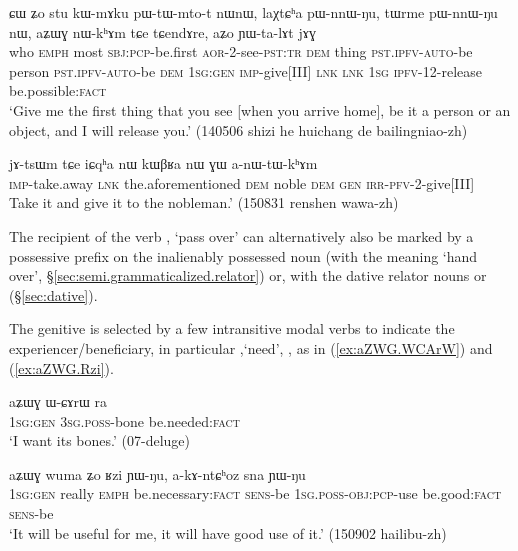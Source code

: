 \begin{exe}
\ex \label{ex:aZWG.nWkhAm}
 \gll ɕɯ ʑo stu kɯ-mɤku pɯ-tɯ-mto-t nɯnɯ, laχtɕʰa pɯ-nnɯ-ŋu, tɯrme pɯ-nnɯ-ŋu nɯ, aʑɯɣ nɯ-kʰɤm tɕe tɕendɤre, aʑo ɲɯ-ta-lɤt jɤɣ \\
 who \textsc{emph} most \textsc{sbj}:\textsc{pcp}-be.first \textsc{aor}-2-see-\textsc{pst}:\textsc{tr} \textsc{dem}  thing \textsc{pst}.\textsc{ipfv}-\textsc{auto}-be   person \textsc{pst}.\textsc{ipfv}-\textsc{auto}-be \textsc{dem} \textsc{1sg}:\textsc{gen} \textsc{imp}-give[III] \textsc{lnk} \textsc{lnk} \textsc{1sg} \textsc{ipfv}-1\fl{}2-release be.possible:\textsc{fact} \\
 \glt `Give me the first thing that you see [when you arrive home], be it a person or an object, and I will release you.' (140506 shizi he huichang de bailingniao-zh)
\end{exe}

\begin{exe}
\ex \label{ex:GW.anWtWkhAm}
 \gll jɤ-tsɯm tɕe iɕqʰa nɯ kɯβʁa nɯ ɣɯ a-nɯ-tɯ-kʰɤm \\
 \textsc{imp}-take.away \textsc{lnk} the.aforementioned \textsc{dem} noble \textsc{dem} \textsc{gen} \textsc{irr}-\textsc{pfv}-2-give[III] \\
 \glt  Take it and give it to the nobleman.' (150831 renshen wawa-zh) 
\end{exe}
 
The recipient of the verb  , `pass over' can alternatively also be marked by a possessive prefix on the inalienably possessed noun  (with the meaning `hand over', §\ref{sec:semi.grammaticalized.relator}) or, with the dative relator nouns  or  (§\ref{sec:dative}).

The genitive is selected by a few intransitive modal verbs to indicate the experiencer/beneficiary, in particular  ,`need', , as in (\ref{ex:aZWG.WCArW}) and (\ref{ex:aZWG.Rzi}).

\begin{exe}
\ex \label{ex:aZWG.WCArW}
 \gll aʑɯɣ ɯ-ɕɤrɯ ra \\
 \textsc{1sg}:\textsc{gen} \textsc{3sg}.\textsc{poss}-bone be.needed:\textsc{fact} \\
\glt `I want its bones.' (07-deluge) 
\end{exe}

\begin{exe}
\ex \label{ex:aZWG.Rzi}
 \gll aʑɯɣ wuma ʑo ʁzi ɲɯ-ŋu, a-kɤ-ntɕʰoz sna ɲɯ-ŋu \\
  \textsc{1sg}:\textsc{gen} really \textsc{emph} be.necessary:\textsc{fact} \textsc{sens}-be \textsc{1sg}.\textsc{poss}-\textsc{obj}:\textsc{pcp}-use be.good:\textsc{fact}  \textsc{sens}-be \\
  \glt `It will be useful for me, it will have good use of it.'  (150902 hailibu-zh) 
\end{exe}

